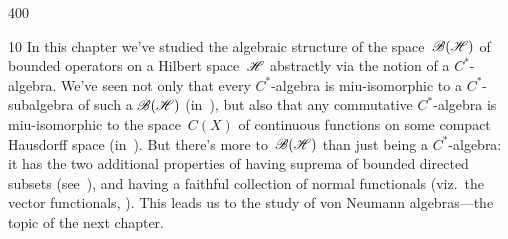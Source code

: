 \begin{parsec}{400}
\begin{point}{10}
In this chapter
we've studied
the algebraic  structure of 
the space~$\mathscr{B}(\mathscr{H})$
of bounded operators on a Hilbert space~$\mathscr{H}$
abstractly 
via the notion
of
a $C^*$-algebra.
We've seen not only that every $C^*$-algebra
is miu-isomorphic to a $C^*$-subalgebra
	of such a $\mathscr{B}(\mathscr{H})$ (in~),
but also that any commutative $C^*$-algebra
is miu-isomorphic
to the space~$C(X)$ of continuous functions
	on some compact Hausdorff space (in~).
But there's more to~$\mathscr{B}(\mathscr{H})$
than just being a $C^*$-algebra:
it has the two additional properties
of having suprema of bounded directed subsets (see~),
and having a faithful collection 
of normal functionals (viz.~the vector functionals,
).
This leads us to the study of von Neumann algebras---the topic
of the next chapter.
\end{point}
\end{parsec}
